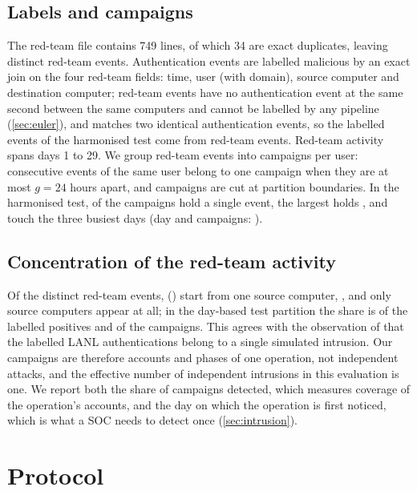\documentclass[11pt,a4paper]{article}
\begin{document}
\subsection{Labels and campaigns}
The red-team file contains 749 lines, of which 34 are exact duplicates, leaving \RedTeamRows{} distinct red-team events. Authentication events are labelled malicious by an exact join on the four red-team fields: time, user (with domain), source computer and destination computer; \RedTeamUnmatched{} red-team events have no authentication event at the same second between the same computers and cannot be labelled by any pipeline (\cref{sec:euler}), and \HarmDoublyLabelled{} matches two identical authentication events, so the \HarmTestPositives{} labelled events of the harmonised test come from \HarmPositivesFromRows{} red-team events. Red-team activity spans days 1 to 29. We group red-team events into campaigns per user: consecutive events of the same user belong to one campaign when they are at most $g = 24$ hours apart, and campaigns are cut at partition boundaries. In the harmonised test, \HarmCampaignSingletons{} of the \HarmTestCampaigns{} campaigns hold a single event, the largest holds \HarmCampaignLargest{}, and \HarmBusiestDaysCampaigns{} touch the three busiest days (day and campaigns: \HarmBusiestDays{}).

\subsection{Concentration of the red-team activity}
\label{sec:concentration}
Of the \RedTeamRows{} distinct red-team events, \RedTeamTopHostEvents{} (\RedTeamTopHostShare{}) start from one source computer, \TopHost{}, and only \RedTeamSourceComputers{} source computers appear at all; in the day-based test partition the share is \TempTestTopHostShare{} of the labelled positives and \TempTestTopHostCampaigns{} of the \TempTestCampaigns{} campaigns. This agrees with the observation of \textcite{larroche2026fair} that the labelled LANL authentications belong to a single simulated intrusion. Our campaigns are therefore accounts and phases of one operation, not independent attacks, and the effective number of independent intrusions in this evaluation is one. We report both the share of campaigns detected, which measures coverage of the operation's accounts, and the day on which the operation is first noticed, which is what a SOC needs to detect once (\cref{sec:intrusion}).

\section{Protocol}
\label{sec:protocol}
\end{document}
